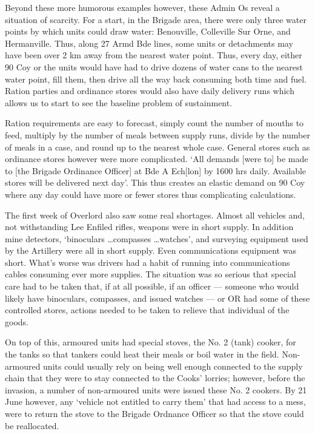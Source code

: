 \documentclass[noraggedright]{turabian-researchpaper}
\begin{document}
Beyond these more humorous examples however, these Admin Os reveal a 
situation of scarcity.  For a start, in the Brigade area, there were only
three water points by which units could draw water:  Benouville, Colleville
Sur Orne, and Hermanville.  Thus, along 27 Armd Bde lines, some units or 
detachments may have been over 2 km away from the nearest water 
point.\autocite[June Adm Order No. 1][Para 4]{27wd}  Thus,
every day, either 90 Coy or the units would have had to drive dozens of water
cans to the nearest water point, fill them, then drive all the way back
consuming both time and fuel.  Ration parties and ordinance stores would also
have daily delivery runs which allows us to start to see the baseline problem
of sustainment.  

Ration requirements are easy to forecast, simply count the number of mouths to 
feed, multiply by the number of meals between supply runs, divide by the number
of meals in a case, and round up to the nearest whole case.  General stores 
such as ordinance stores however were more complicated.  `All demands [were to]
be made to [the Brigade Ordinance Officer] at Bde A Ech[lon] by 1600 hrs daily.
Available stores will be delivered next day'.\autocite[June Admin Order No. 1]
[Para 6a]{27wd}  This thus creates an elastic demand on 90 Coy where any day
could have more or fewer stores thus complicating calculations.  

The first week of Overlord also saw some real shortages.  Almost all vehicles
and, not withstanding Lee Enfiled rifles, weapons were in short supply.  In 
addition mine detectors, `binoculars \ldots compasses \ldots watches', and 
surveying equipment used by the Artillery were all in short supply.  Even
communications equipment was short.\autocite[Appendix A to 27 Armd Bde Adm 
Order No. 1 (June)]{27wd} What's worse was drivers had a habit of running
into communications cables consuming ever more supplies.\autocite[June Adm 
Order No. 2][Para 3]{27wd}  The situation was so serious that special care 
had to be taken that, if at all possible, if an officer --- someone who
would likely have binoculars, compasses, and issued watches --- or OR had
some of these controlled stores, actions needed to be taken to relieve that
individual of the goods.  

On top of this, armoured units had special stoves, the No. 2 (tank) cooker,
for the tanks so that tankers
could heat their meals or boil water in the field. Non-armoured units could 
usually rely on being well enough connected to the supply chain that they 
were to stay connected to the Cooks' lorries; however, before the invasion, a
number of non-armoured units were issued these No. 2 cookers.  By 21 June
however, any `vehicle not entitled to carry them' that had access to a mess,
were to return the stove to the Brigade Ordnance Officer so that the stove
could be reallocated.\autocite[June Adm Order No. 3][Para 3a]{27wd}
\end{document}
